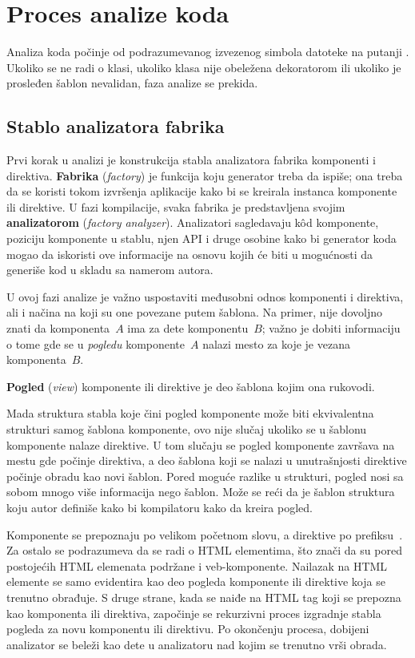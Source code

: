 \section{Proces analize koda}

Analiza koda počinje od podrazumevanog izvezenog simbola datoteke na putanji .
Ukoliko se ne radi o klasi, ukoliko klasa nije obeležena dekoratorom  ili ukoliko je prosleđen šablon nevalidan, faza analize se prekida.

\subsection{Stablo analizatora fabrika}

Prvi korak u analizi je konstrukcija stabla analizatora fabrika komponenti i direktiva.
\textbf{Fabrika} (\textsl{factory}) je funkcija koju generator treba da ispiše; ona treba da se koristi tokom izvršenja aplikacije kako bi se kreirala instanca komponente ili direktive.
U fazi kompilacije, svaka fabrika je predstavljena svojim \textbf{analizatorom} (\textsl{factory analyzer}).
Analizatori sagledavaju kôd komponente, poziciju komponente u stablu, njen API i druge osobine kako bi generator koda mogao da iskoristi ove informacije na osnovu kojih će biti u mogućnosti da generiše kod u skladu sa namerom autora.

U ovoj fazi analize je važno uspostaviti međusobni odnos komponenti i direktiva, ali i načina na koji su one povezane putem šablona.
Na primer, nije dovoljno znati da komponenta~$A$ ima za dete komponentu~$B$; važno je dobiti informaciju o tome gde se u \emph{pogledu} komponente~$A$ nalazi mesto za koje je vezana komponenta~$B$.

\textbf{Pogled} (\textsl{view}) komponente ili direktive je deo šablona kojim ona rukovodi.

Mada struktura stabla koje čini pogled komponente može biti ekvivalentna strukturi samog šablona komponente, ovo nije slučaj ukoliko se u šablonu komponente nalaze direktive.
U tom slučaju se pogled komponente završava na mestu gde počinje direktiva, a deo šablona koji se nalazi u unutrašnjosti direktive počinje obradu kao novi šablon.
Pored moguće razlike u strukturi, pogled nosi sa sobom mnogo više informacija nego šablon.
Može se reći da je šablon struktura koju autor definiše kako bi  kompilatoru kako da kreira pogled.

Komponente se prepoznaju po velikom početnom slovu, a direktive po prefiksu~.
Za ostalo se podrazumeva da se radi o HTML elementima, što znači da su pored postojećih HTML elemenata podržane i veb-komponente.
Nailazak na HTML elemente se samo evidentira kao deo pogleda komponente ili direktive koja se trenutno obrađuje.
S druge strane, kada se naiđe na HTML tag koji se prepozna kao komponenta ili direktiva, započinje se rekurzivni proces izgradnje stabla pogleda za novu komponentu ili direktivu.
Po okončenju procesa, dobijeni analizator se beleži kao dete u analizatoru nad kojim se trenutno vrši obrada.

